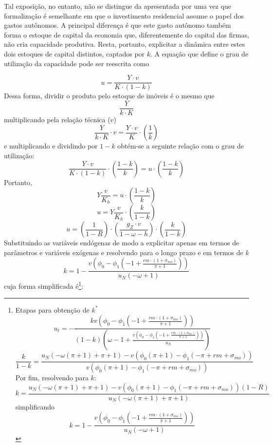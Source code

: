 
Tal exposição, no entanto, não se distingue da apresentada por \textcite{freitas_growth_2015} uma vez que formalização é semelhante em que o investimento residencial assume o papel dos gastos autônomos. A principal diferença é que este gasto autônomo também forma o estoque de capital da economia que, diferentemente do capital das firmas, não cria capacidade produtiva. Resta, portanto, explicitar a dinâmica entre estes dois estoques de capital distintos, captados por $k$. A equação que define o grau de utilização da capacidade pode ser reescrita como

$$
u = \frac{Y\cdot v}{K \cdot (1-k)}
$$
Dessa forma, dividir o produto pelo estoque de imóveis é o mesmo que
$$
\frac{Y}{k\cdot K}
$$
multiplicando pela relação técnica ($v$)
$$
\frac{Y}{k\cdot K}\cdot v = \frac{Y\cdot v}{K}\cdot \left(\frac{1}{k}\right)
$$
e multiplicando e dividindo por $1-k$ obtém-se a seguinte relação com o grau de utilização:
$$
\frac{Y\cdot v}{K\cdot (1-k)}\cdot \left(\frac{1-k}{k}\right) = u \cdot \left(\frac{1-k}{k}\right)
$$
Portanto,
$$
Y\frac{v}{K_h} =  u \cdot \left(\frac{1-k}{k}\right)
$$
$$
u = Y\frac{v}{K_h} \cdot \left(\frac{k}{1-k}\right)
$$
\begin{equation}
u = \left(\frac{1}{1-R}\right)\cdot\left(\frac{g_Z\cdot v}{1-\omega- h}\right)\cdot\left(\frac{k}{1-k}\right)
\end{equation}
Substituindo as variáveis endógenas de modo a explicitar apenas em termos de parâmetros e variáveis exógenas e resolvendo para o longo prazo e em termos de $k$
\begin{equation}
\label{kAnali}
k = 1 - \frac{v \left(\phi_{0} - \phi_{1} \left(-1 + \frac{rm\cdot(1+\sigma_{mo})}{\pi + 1}\right)\right)}{u_N \left(- \omega + 1\right)}
\end{equation}
cuja forma simplificada é\footnote{Etapas para obtenção de $k^*$
	$$
	u_t = - \frac{k v \left(\phi_{0} - \phi_{1} \left(-1 + \frac{rm\cdot(1+\sigma_{mo})}{\pi + 1}\right)\right)}{\left(1 - k\right) \left(\omega - 1 + \frac{v \left(\phi_{0} - \phi_{1} \left(-1 + \frac{rm\cdot(1+\sigma_{mo})}{\pi + 1}\right)\right)}{u_N}\right)}
	$$
	$$
	\frac{k}{1 - k} = \frac{u_N \left(- \omega \left(\pi + 1\right) + \pi + 1\right) - v \left(\phi_{0} \left(\pi + 1\right) - \phi_{1} \left(- \pi + rm + \sigma_{mo}\right)\right)}{v \left(\phi_{0} \left(\pi + 1\right) - \phi_{1} \left(- \pi + rm + \sigma_{mo}\right)\right)}
	$$
	Por fim, resolvendo para $k$:
	$$
	k = \frac{u_N \left(- \omega \left(\pi + 1\right) + \pi + 1\right) - v \left(\phi_{0} \left(\pi + 1\right) - \phi_{1} \left(- \pi + rm + \sigma_{mo}\right)\right)(1-R)}{u_N \left(- \omega \left(\pi + 1\right) + \pi + 1\right)}
	$$
simplificando
$$
k = 1 - \frac{v \left(\phi_{0} - \phi_{1} \left(-1 + \frac{rm\cdot(1+\sigma_{mo})}{\pi + 1}\right)\right)}{u_N \left(- \omega + 1\right)}
$$
}:
